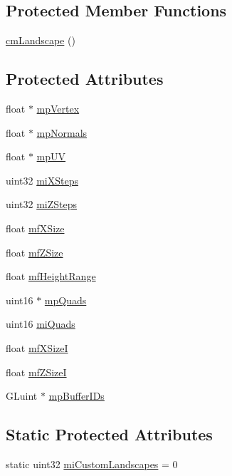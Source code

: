 \subsection*{Protected Member Functions}
\begin{DoxyCompactItemize}
\item 
\hyperlink{classcm_landscape_a6d73bf9fe52e1164ece8e379647fa8e6}{cmLandscape} ()
\end{DoxyCompactItemize}
\subsection*{Protected Attributes}
\begin{DoxyCompactItemize}
\item 
float $\ast$ \hyperlink{classcm_landscape_ab411ed8b3f9c55c32de92691f1d26719}{mpVertex}
\item 
float $\ast$ \hyperlink{classcm_landscape_ad246109fb99078e43310f481982017bb}{mpNormals}
\item 
float $\ast$ \hyperlink{classcm_landscape_a865c21a15cb293c915bcbf398c683641}{mpUV}
\item 
uint32 \hyperlink{classcm_landscape_ab66f6a730a24ea8682cbe916eb2ca33a}{miXSteps}
\item 
uint32 \hyperlink{classcm_landscape_a1e54f8fe6b5cd944870ddc3e86ded434}{miZSteps}
\item 
float \hyperlink{classcm_landscape_ac30d26f95eaf4c8b9d0f0ea1c38d2cc8}{mfXSize}
\item 
float \hyperlink{classcm_landscape_ae77a0f253b6815a72438712c42127367}{mfZSize}
\item 
float \hyperlink{classcm_landscape_a82a303e72c4bd314a1472cdfd67d3c0e}{mfHeightRange}
\item 
uint16 $\ast$ \hyperlink{classcm_landscape_a687c15e79989921c1962de385f31778c}{mpQuads}
\item 
uint16 \hyperlink{classcm_landscape_a2851b72bc9a1f1b70945f3799ecf80a0}{miQuads}
\item 
float \hyperlink{classcm_landscape_a3a7a1d57d528ce8fda0f58952fe5f7af}{mfXSizeI}
\item 
float \hyperlink{classcm_landscape_a64b6b9e54f84620e8b8bf3dd083dbbb9}{mfZSizeI}
\item 
GLuint $\ast$ \hyperlink{classcm_landscape_a4366dd85773f117e3ab18220552a8c69}{mpBufferIDs}
\end{DoxyCompactItemize}
\subsection*{Static Protected Attributes}
\begin{DoxyCompactItemize}
\item 
static uint32 \hyperlink{classcm_landscape_a76f88fec0fc083241762102d265a7dfc}{miCustomLandscapes} = 0
\end{DoxyCompactItemize}
